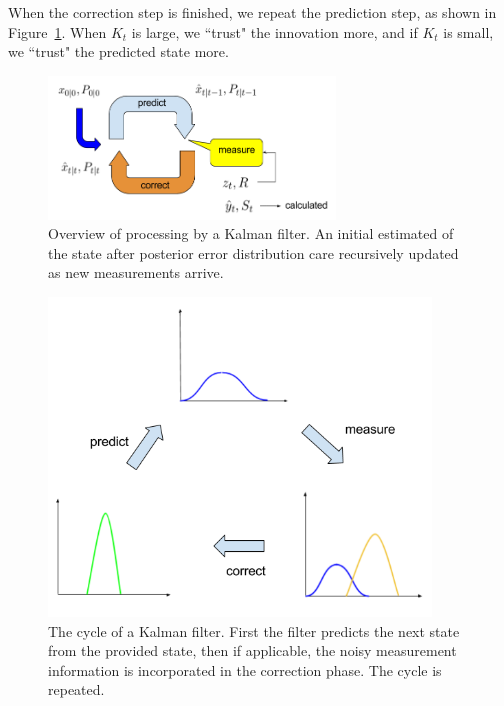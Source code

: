 When the correction step is finished, we repeat the prediction step, as shown in Figure~\ref{fig:kalmanprocess}. When $K_t$ is large, we \textquotedblleft trust" the innovation more, and if $K_t$ is small, we \textquotedblleft trust" the predicted state more.

\begin{figure}[t]
	\centering
	\includegraphics[width=3in]{figures/kalmanprocess.jpg}  
	\caption[Overview of processing by a Kalman filter]{Overview of processing by a Kalman filter. An initial estimated of the state after posterior error distribution care recursively updated as new measurements arrive. }
	\label{fig:kalmanprocess}
\end{figure}

\begin{figure}[t]
	\centering
	\includegraphics[width=4in]{figures/kalman.jpg}  
	\caption[The cycle of a Kalman filter]{The cycle of a Kalman filter. First the filter predicts the next state from the provided state, then if applicable, the noisy measurement information is incorporated in the correction phase. The cycle is repeated. }
	\label{fig:kalman}
\end{figure}


\FloatBarrier

